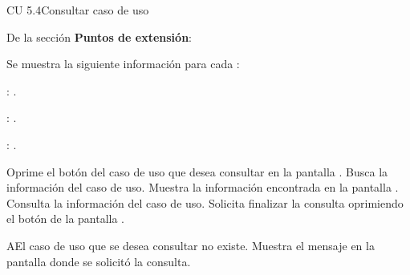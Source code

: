 \begin{UseCase}{CU 5.4}{Consultar caso de uso}
{			\UCli De la sección {\bf Puntos de extensión}:
			\begin{Citemize}
		        \item Se muestra la siguiente información para cada :
				\begin{Citemize}
	 				\item {}: \ioObtener.
	 				\item {}: \ioObtener.
	 				\item {}: \ioObtener.
				\end{Citemize}
			\end{Citemize}
		
	}
	

	


\end{UseCase}
 \begin{UCtrayectoria}
	\UCpaso[\UCactor] Oprime el botón \btnConsulta del caso de uso que desea consultar en la pantalla .
    \UCpaso[\UCsist] Busca la información del caso de uso.  %
    \UCpaso[\UCsist] Muestra la información encontrada en la pantalla .
    \UCpaso[\UCactor] Consulta la información del caso de uso. \label{cu5.4:consultarElemento} 
    \UCpaso[\UCactor] Solicita finalizar la consulta oprimiendo el botón  de la pantalla .
 \end{UCtrayectoria}
 
 \begin{UCtrayectoriaA}{A}{El caso de uso que se desea consultar no existe.}
    \UCpaso[\UCsist] Muestra el mensaje  en la pantalla donde se solicitó la consulta.
 \end{UCtrayectoriaA} 
 

